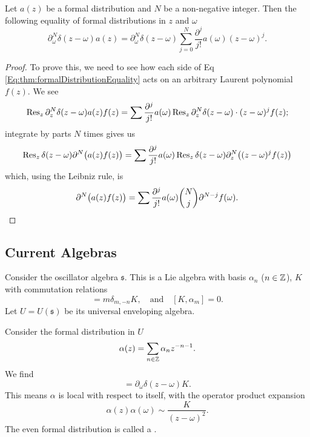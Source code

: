 \begin{thm}
Let $a(z)$ be a formal distribution and $N$ be a non-negative
integer. Then the following equality of formal distributions in $z$ and
$\omega$ 
\begin{equation}\label{Eq:thm:formalDistributionEquality}
\partial_{\omega}^{N}\delta(z-\omega)a(z)
=\partial_{\omega}^{N}\delta(z-\omega)
  \sum^{N}_{j=0}\frac{\partial^{j}}{j!}a(\omega)(z-\omega)^{j}.
\end{equation}
\end{thm}
\begin{proof}
To prove this, we need to see how each side of
Eq \eqref{Eq:thm:formalDistributionEquality} acts on an arbitrary
Laurent polynomial $f(z)$.
We see
\begin{equation}
\Res[z]{\partial_{z}^{N}\delta(z-\omega)a(z)f(z)}=\sum\frac{\partial^{j}}{j!}
a(\omega)\Res[z]{\partial_{z}^{N}\delta(z-\omega)\cdot(z-\omega)^{j}f(z)};
\end{equation}
integrate by parts $N$ times gives us
\begin{equation}
\Res[z]{\delta(z-\omega)\partial^{N}\bigl(a(z)f(z)\bigr)}
=\sum\frac{\partial^{j}}{j!}a(\omega)\Res[z]{\delta(z-\omega)
\partial_{z}^{N}\bigl((z-\omega)^{j}f(z)\bigr)}
\end{equation}
which, using the Leibniz rule, is
\begin{equation*}
\partial^{N}\bigl(a(z)f(z)\bigr)
=\sum\frac{\partial^{j}}{j!}a(\omega)\binom{N}{j}\partial^{N-j}f(\omega).\qedhere
\end{equation*}
\end{proof}

\subsection{Current Algebras}
\M
Consider the oscillator algebra $\mathfrak{s}$. This is a Lie algebra
with basis $\alpha_n$ ($n\in\ZZ$), $K$ with commutation relations
\begin{equation}
[\alpha_m,\alpha_n]=m\delta_{m,-n}K,\quad\mbox{and}\quad
[K,\alpha_m]=0.
\end{equation}
Let $U=U(\mathfrak{s})$ be its universal enveloping algebra.

\M
Consider the formal distribution in $U$
\begin{equation}
\alpha(z)=\sum_{n\in\ZZ}\alpha_nz^{-n-1}.
\end{equation}
We find
\begin{equation}
[\alpha(z),\alpha(\omega)]=\partial_{\omega}\delta(z-\omega)K.
\end{equation}
This means $\alpha$ is local with respect to itself, with the operator
product expansion
\begin{equation}
\alpha(z)\alpha(\omega)\sim\frac{K}{(z-\omega)^{2}}.
\end{equation}
The even formal distribution is called a .

